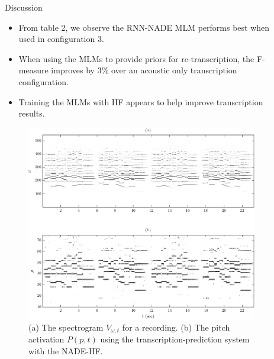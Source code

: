 \documentclass[final]{beamer}
\newlength{\sepwid}
\newlength{\onecolwid}
\newlength{\twocolwid}
\begin{document}
\begin{frame}[t]
\begin{columns}[t]
\begin{column}{\twocolwid}




\end{column} %

\begin{column}{\sepwid}\end{column} %

\begin{column}{\onecolwid} %


\begin{block}{Discussion}

\begin{itemize}
\item From table 2, we observe the RNN-NADE MLM performs best when used in configuration 3.
\item When using the MLMs to provide priors for re-transcription, the F-measure improves by $3\%$ over an acoustic only transcription configuration.
\item Training the MLMs with HF appears to help improve transcription results.
\end{itemize}

\begin{figure}
\includegraphics[width=0.9\linewidth]{FigSpectrogram.png}
\caption{(a) The spectrogram $V_{\omega,t}$ for a recording. (b) The pitch activation $P(p,t)$ using the  transcription-prediction system with the NADE-HF.}
\end{figure}


\end{block}
\end{column}
\end{columns}
\end{frame}
\end{document}
